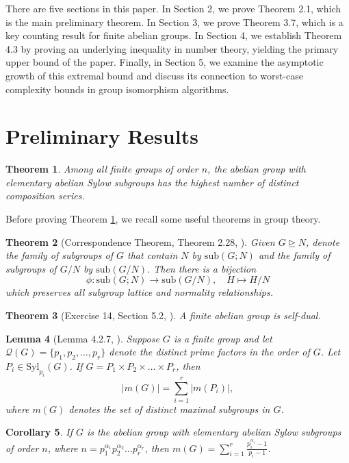 \documentclass[11pt,a4paper]{article}
\newtheorem{theorem}{Theorem}[section]
\newtheorem{lemma}[theorem]{Lemma}
\newtheorem{corollary}[theorem]{Corollary}
\theoremstyle{definition}
\begin{document}
There are five sections in this paper. In Section 2, we prove Theorem 2.1, which is the main preliminary theorem. In Section 3, we prove Theorem 3.7, which is a key counting result for finite abelian groups. In Section 4, we establish Theorem 4.3 by proving an underlying inequality in number theory, yielding the primary upper bound of the paper. Finally, in Section 5, we examine the asymptotic growth of this extremal bound and discuss its connection to worst-case complexity bounds in group isomorphism algorithms.

\section{Preliminary Results}

\begin{theorem}\label{thm2.1}
Among all finite groups of order $n$, the abelian group with elementary abelian Sylow subgroups has the highest number of distinct composition series.
\end{theorem}

Before proving Theorem \ref{thm2.1}, we recall some useful theorems in group theory.

\begin{theorem}[Correspondence Theorem, Theorem 2.28, \cite{rotman}]
Given $G \trianglerighteq N$, denote the family of subgroups of $G$ that contain $N$ by $\text{sub}(G; N)$ and the family of subgroups of $G/N$ by $\text{sub}(G/N)$. Then there is a bijection
\[
\phi : \text{sub}(G; N) \longrightarrow \text{sub}(G/N), \quad H \mapsto H/N
\]
which preserves all subgroup lattice and normality relationships.
\end{theorem}

\begin{theorem}[Exercise 14, Section 5.2, \cite{dummit}]
A finite abelian group is self-dual.
\end{theorem}

\begin{lemma}[Lemma 4.2.7, \cite{lauderdale}]
Suppose $G$ is a finite group and let $\mathcal{Q}(G) = \{p_1, p_2, \dots, p_r\}$ denote the distinct prime factors in the order of $G$. Let $P_i \in \text{Syl}_{p_i}(G)$. If $G = P_1 \times P_2 \times \dots \times P_r$, then
\[
|m(G)| = \sum_{i=1}^r |m(P_i)|,
\]
where $m(G)$ denotes the set of distinct maximal subgroups in $G$.
\end{lemma}

\begin{corollary}\label{cor2.5}
If $G$ is the abelian group with elementary abelian Sylow subgroups of order $n$, where $n = p_1^{\alpha_1} p_2^{\alpha_2} \dots p_r^{\alpha_r}$, then $m(G) = \sum_{i=1}^r \frac{p_i^{\alpha_i} - 1}{p_i - 1}$.
\end{corollary}
\end{document}
